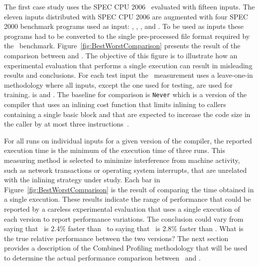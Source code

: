 The first case study uses the SPEC CPU 2006  \gcc\ evaluated with fifteen inputs. The eleven inputs distributed with SPEC CPU 2006 are augmented with  four SPEC 2000 benchmark programs used as input: \bzip, \lbm, \mcf, and \parser. To be used as inputs these programs had to be converted to the single pre-processed file format required by the \gcc\ benchmark.
Figure~\ref{fig:BestWorstComparison}  presents the result of the comparison between \llvm and \FDI. The objective of this figure is to illustrate how an experimental evaluation that performs a single execution can result in misleading results and conclusions. For each test input the \FDI\ measurement uses a leave-one-in methodology where all inputs, except the one used for testing, are used for training. is and \llvm. The baseline for comparison is  {\tt Never} which is a version of the compiler that uses an inlining cost function that limits inlining to callers containing a single basic block and that are expected to increase the code size in the caller by at most three instructions~\cite{BerubePhD12}.

For all runs on individual inputs for a given version of the compiler, the reported execution time is the minimum of the execution time of three runs. This measuring method is selected to minimize interference from machine activity, such as network transactions or operating system interrupts, that are unrelated with the inlining strategy under study.  Each bar in Figure~\ref{fig:BestWorstComparison} is the result of comparing the time obtained in a single execution. These results indicate the range of performance that could be reported by a careless experimental evaluation that uses a single execution of each version to report performance variations. The conclusion could vary from saying that \FDI\ is 2.4\% faster than \llvm\ to saying that \llvm\ is 2.8\% faster than \FDI. What is the true relative performance between the two versions? The next section provides a description of the Combined Profiling methodology that will be used to determine the actual performance comparison between \FDI\ and \llvm.
 


